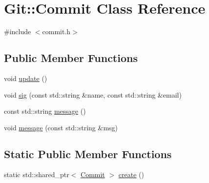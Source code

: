 \hypertarget{class_git_1_1_commit}{\section{Git\-:\-:Commit Class Reference}
\label{class_git_1_1_commit}
}


{\ttfamily \#include $<$commit.\-h$>$}

\subsection*{Public Member Functions}
\begin{DoxyCompactItemize}
\item 
void \hyperlink{class_git_1_1_commit_a3540ad2a8f51a895dcb508b95ca8fd39}{update} ()
\item 
void \hyperlink{class_git_1_1_commit_aa759cb4bb4a1ae454d5d76896fabe787}{sig} (const std\-::string \&name, const std\-::string \&email)
\item 
const std\-::string \hyperlink{class_git_1_1_commit_a54d5713f3bff0b54935d55a72c71d4e8}{message} ()
\item 
void \hyperlink{class_git_1_1_commit_a0034dbec5ae88697b8896da8254620de}{message} (const std\-::string \&msg)
\end{DoxyCompactItemize}
\subsection*{Static Public Member Functions}
\begin{DoxyCompactItemize}
\item 
static std\-::shared\-\_\-ptr$<$ \hyperlink{class_git_1_1_commit}{Commit} $>$ \hyperlink{class_git_1_1_commit_ad90040d7ee2670ea170ff071a5bb09bc}{create} ()
\end{DoxyCompactItemize}


